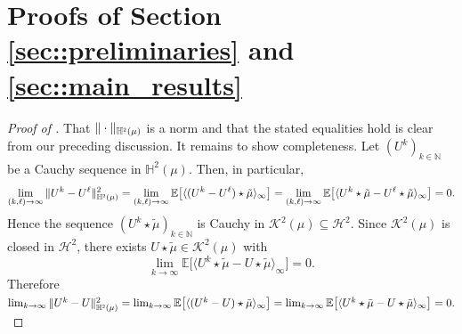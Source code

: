 \documentclass[10pt]{article} %
\newcommand\cH{\mathcal H}
\newcommand\cK{\mathcal K}
\newcommand{\smalltext}[1]{\text{\fontsize{4}{4}\selectfont$#1$}}
\def \E{\mathbb{E}}
\def \H{\mathbb{H}}
\def \N{\mathbb{N}}
\newcommand{\1}{\mathbf{1}}
\begin{document}
\appendix

\section{Proofs of Section \ref{sec::preliminaries} and \ref{sec::main_results}}\label{app::proofs_preliminaries}

\begin{proof}[Proof of ]\label{proof::completeness_ivm}
	That $\|\cdot\|_{\H^\smalltext{2}(\mu)}$ is a norm and that the stated equalities hold is clear from our preceding discussion. It remains to show completeness. Let $(U^k)_{k \in \N}$ be a Cauchy sequence in $\H^2(\mu)$. 
	Then, in particular,
	\begin{equation*}
		\lim_{(k,\ell) \rightarrow \infty}\|U^k - U^\ell\|^2_{\H^\smalltext{2}(\mu)} = \lim_{(k,\ell) \rightarrow \infty}\E\big[\langle (U^k - U^\ell) \star \tilde\mu\rangle_\infty \big] = \lim_{(k,\ell) \rightarrow \infty}\E\big[\langle U^k \star \tilde\mu - U^\ell \star \tilde\mu\rangle_\infty \big] = 0.
	\end{equation*}
	Hence the sequence $(U^k \star \tilde\mu)_{k \in \N}$ is Cauchy in $\cK^2(\mu) \subseteq \cH^2$. Since $\cK^2(\mu)$ is closed in $\cH^2$, there exists $U \star \tilde\mu \in \cK^2(\mu)$ with
	\begin{equation*}
		\lim_{k \rightarrow \infty}\E\big[\langle U^k \star \tilde\mu - U \star \tilde\mu \rangle_\infty \big] = 0.
	\end{equation*}
	Therefore $\lim_{k \rightarrow \infty}\|U^k - U\|^2_{\H^\smalltext{2}(\mu)} = \lim_{k \rightarrow \infty}\E\big[\langle (U^k - U) \star \tilde\mu\rangle_\infty \big] = \lim_{k \rightarrow \infty}\E\big[\langle U^k \star \tilde\mu - U \star \tilde\mu\rangle_\infty \big]= 0.$
\end{proof}
\end{document}
